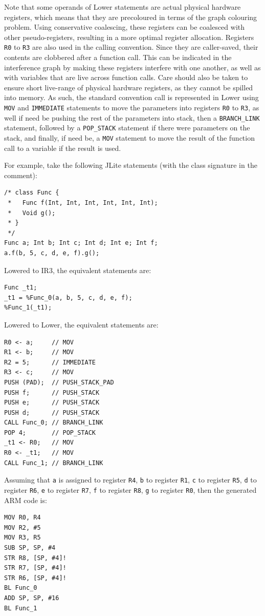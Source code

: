 \documentclass[nonacm, acmsmall, screen, 10pt]{acmart}
\begin{document}
Note that some operands of Lower statements are actual physical hardware registers, which means that they are precoloured in terms of the graph colouring problem.
Using conservative coalescing, these registers can be coalesced with other pseudo-registers, resulting in a more optimal register allocation.
Registers \texttt{R0} to \texttt{R3} are also used in the calling convention.
Since they are caller-saved, their contents are clobbered after a function call.
This can be indicated in the interference graph by making these registers interfere with one another, as well as with variables that are live across function calls.
Care should also be taken to ensure short live-range of physical hardware registers, as they cannot be spilled into memory.
As such, the standard convention call is represented in Lower using \texttt{MOV} and \texttt{IMMEDIATE} statements to move the parameters into registers \texttt{R0} to \texttt{R3}, as well if need be pushing the rest of the parameters into stack, then a \texttt{BRANCH\_LINK} statement, followed by a \texttt{POP\_STACK} statement if there were parameters on the stack, and finally, if need be, a \texttt{MOV} statement to move the result of the function call to a variable if the result is used.

For example, take the following JLite statements (with the class signature in the comment):
\begin{verbatim}
/* class Func {
 *   Func f(Int, Int, Int, Int, Int, Int);
 *   Void g();
 * }
 */
Func a; Int b; Int c; Int d; Int e; Int f;
a.f(b, 5, c, d, e, f).g();
\end{verbatim}

Lowered to IR3, the equivalent statements are:
\begin{verbatim}
Func _t1;
_t1 = %Func_0(a, b, 5, c, d, e, f);
%Func_1(_t1);
\end{verbatim}

Lowered to Lower, the equivalent statements are:
\begin{verbatim}
R0 <- a;     // MOV
R1 <- b;     // MOV
R2 = 5;      // IMMEDIATE
R3 <- c;     // MOV
PUSH (PAD);  // PUSH_STACK_PAD
PUSH f;      // PUSH_STACK
PUSH e;      // PUSH_STACK
PUSH d;      // PUSH_STACK
CALL Func_0; // BRANCH_LINK
POP 4;       // POP_STACK
_t1 <- R0;   // MOV
R0 <- _t1;   // MOV
CALL Func_1; // BRANCH_LINK
\end{verbatim}

Assuming that \texttt{a} is assigned to register \texttt{R4}, \texttt{b} to register \texttt{R1}, \texttt{c} to register \texttt{R5}, \texttt{d} to register \texttt{R6}, \texttt{e} to register \texttt{R7}, \texttt{f} to register \texttt{R8}, \texttt{g} to register \texttt{R0}, then the generated ARM code is:
\begin{verbatim}
MOV R0, R4
MOV R2, #5
MOV R3, R5
SUB SP, SP, #4
STR R8, [SP, #4]!
STR R7, [SP, #4]!
STR R6, [SP, #4]!
BL Func_0
ADD SP, SP, #16
BL Func_1
\end{verbatim}
\end{document}
